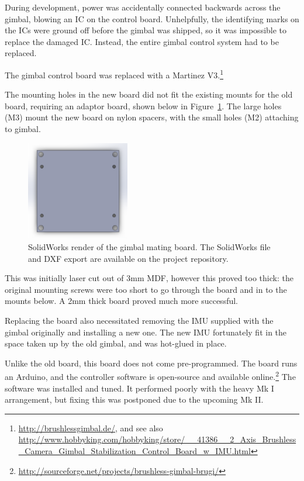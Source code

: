 \documentclass[12pt,oneside,a4paper,draft]{book}
\begin{document}
During development, power was accidentally connected backwards across
the gimbal, blowing an \gls{IC} on the control board. Unhelpfully, the
identifying marks on the ICs were ground off before the gimbal was
shipped, so it was impossible to replace the damaged IC. Instead, the
entire gimbal control system had to be replaced.

The gimbal control board was replaced with a Martinez
V3.\footnote{\url{http://brushlessgimbal.de/}, and see also \url{http://www.hobbyking.com/hobbyking/store/__41386__2_Axis_Brushless_Camera_Gimbal_Stabilization_Control_Board_w_IMU.html}}

The mounting holes in the new board did not fit the existing
mounts for the old board, requiring an adaptor board, shown below in
Figure~\ref{fig:gmb}. The large holes (M3) mount the new board on
nylon spacers, with the small holes (M2) attaching to gimbal.

\begin{figure}[h]
  \centering
  \includegraphics[width=0.4\textwidth]{figs/gmb}
  \caption{SolidWorks render of the gimbal mating board. The
    SolidWorks file and DXF export are available on the project repository.}
  \label{fig:gmb}
\end{figure}

This was initially laser cut out of 3mm \gls{MDF}, however this proved too
thick: the original mounting screws were too short to go through the
board and in to the mounts below. A 2mm thick board proved much more
successful.
 
Replacing the board also necessitated removing the IMU supplied with
the gimbal originally and installing a new one. The new IMU
fortunately fit in the space taken up by the old gimbal, and was
hot-glued in place.

Unlike the old board, this board does not come pre-programmed. The
board runs an Arduino, and the controller software is open-source and
available online.\footnote{\url{http://sourceforge.net/projects/brushless-gimbal-brugi/}} The software was installed and
tuned. It performed poorly with the heavy Mk I arrangement, but fixing
this was postponed due to the upcoming Mk II.
\end{document}
